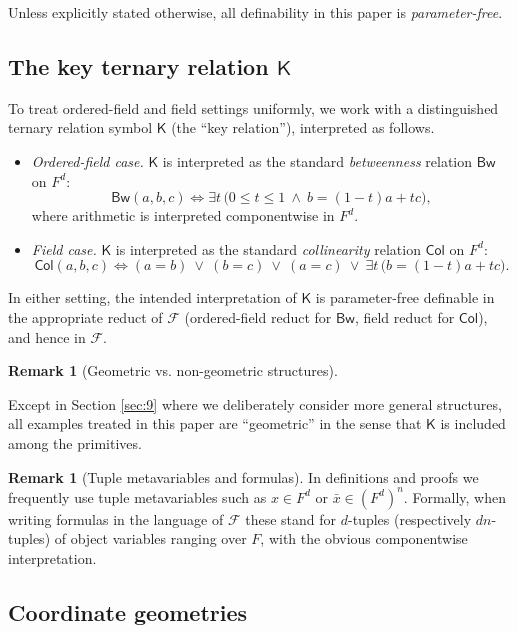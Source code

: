 \documentclass[11pt,a4paper]{article}
\newcommand{\F}{\mathcal{F}}
\theoremstyle{definition}
\newtheorem{remark}[theorem]{Remark}
\begin{document}
Unless explicitly stated otherwise, all definability in this paper is
\emph{parameter-free}.

\subsection{The key ternary relation \texorpdfstring{$\mathsf K$}{K}}
\label{sec:2.2}

To treat ordered-field and field settings uniformly, we work with a
distinguished ternary relation symbol $\mathsf K$ (the ``key relation''),
interpreted as follows.

\begin{itemize}
\item
  \emph{Ordered-field case.} $\mathsf K$ is interpreted as the
  standard \emph{betweenness} relation $\mathsf{Bw}$ on $F^d$: \[
  \mathsf{Bw}(a,b,c) \iff \exists t\,\big(0\le t\le 1\ \wedge\ b=(1-t)a+tc\Big),
  \] where arithmetic is interpreted componentwise in $F^d$.
\item
  \emph{Field case.} $\mathsf K$ is interpreted as the standard
  \emph{collinearity} relation $\mathsf{Col}$ on $F^d$: \[
  \mathsf{Col}(a,b,c) \iff (a=b)\ \vee\ (b=c)\ \vee\ (a=c)\ \vee\ \exists t\,\big(b=(1-t)a+tc\big).
  \]
\end{itemize}

In either setting, the intended interpretation of $\mathsf K$ is
parameter-free definable in the appropriate reduct of $\F$
(ordered-field reduct for $\mathsf{Bw}$, field reduct for
$\mathsf{Col}$), and hence in $\F$.

\begin{remark}[Geometric vs. non-geometric structures]
\label{rem:2.1}

Except in Section \ref{sec:9} where we deliberately consider more general structures,
all examples treated in this paper are ``geometric'' in the sense that
$\mathsf K$ is included among the primitives. 
\end{remark}

\begin{remark}[Tuple metavariables and formulas]
	\label{rem:2.3}
	 In definitions
and proofs we frequently use tuple metavariables such as $x\in F^d$ or
$\bar x\in (F^d)^n$. Formally, when writing formulas in the language
of $\F$ these stand for $d$-tuples (respectively
$dn$-tuples) of object variables ranging over $F$, with the obvious
componentwise interpretation.
\end{remark}


\subsection{Coordinate geometries}
\label{sec:2.3}
\end{document}

